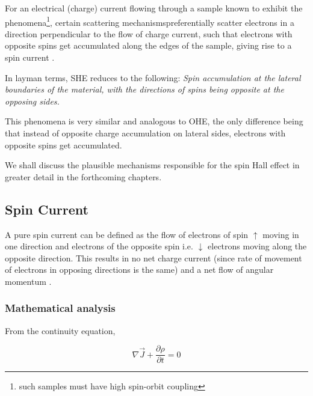 
For an electrical (charge) current flowing through a sample known to exhibit the phenomena\footnote{such samples must have high spin-orbit coupling}, certain scattering mechanisms\footnotemark preferentially scatter electrons in a direction perpendicular to the flow of charge current, such that electrons with opposite spins get accumulated along the edges of the sample, giving rise to a spin current \cite{dyakonov1971current,hirsch1999spin}.

In layman terms, SHE reduces to the following: \textit{Spin accumulation at the lateral boundaries of the material, with the directions of spins being opposite at the opposing sides.}

This phenomena is very similar and analogous to OHE, the only difference being that instead of opposite charge accumulation on lateral sides, electrons with opposite spins get accumulated.

We shall discuss the plausible mechanisms responsible for the spin Hall effect in greater detail in the forthcoming chapters.

\subsection{Spin Current}

\label{subsec:spin-current}

A pure spin current can be defined as the flow of electrons of spin $ \uparrow $ moving in one direction and electrons of the opposite spin i.e. $ \downarrow $ electrons moving along the opposite direction.
This results in no net charge current (since rate of movement of electrons in opposing directions is the same) and a net flow of angular momentum \cite{krishnan2016fundamentals}.

\subsubsection{Mathematical analysis}

From the continuity equation,

\begin{equation} \label{continuity}
    \nabla \vec{J} + \frac{\partial \rho}{\partial t} = 0
\end{equation}


